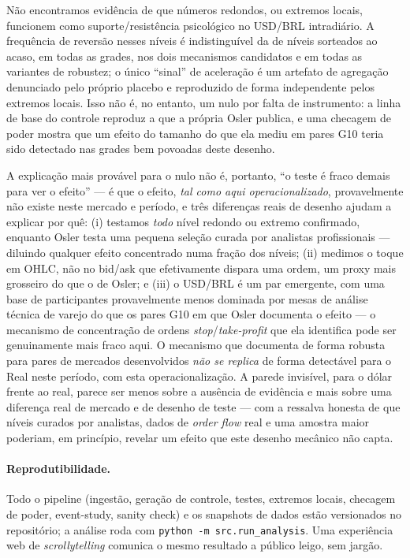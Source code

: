 \documentclass[11pt,a4paper]{article}
\begin{document}
Não encontramos evidência de que números redondos, ou extremos locais, funcionem como
suporte/resistência psicológico no USD/BRL intradiário. A frequência de reversão nesses
níveis é indistinguível da de níveis sorteados ao acaso, em todas as grades, nos dois
mecanismos candidatos e em todas as variantes de robustez; o único ``sinal'' de aceleração é
um artefato de agregação denunciado pelo próprio placebo e reproduzido de forma independente
pelos extremos locais. Isso não é, no entanto, um nulo por falta de instrumento: a linha de
base do controle reproduz a que a própria Osler publica, e uma checagem de poder mostra que um
efeito do tamanho do que ela mediu em pares G10 teria sido detectado nas grades bem povoadas
deste desenho.

A explicação mais provável para o nulo não é, portanto, ``o teste é fraco demais para ver o
efeito'' --- é que o efeito, \emph{tal como aqui operacionalizado}, provavelmente não existe
neste mercado e período, e três diferenças reais de desenho ajudam a explicar por quê: (i)
testamos \emph{todo} nível redondo ou extremo confirmado, enquanto Osler testa uma pequena
seleção curada por analistas profissionais --- diluindo qualquer efeito concentrado numa
fração dos níveis; (ii) medimos o toque em OHLC, não no bid/ask que efetivamente dispara uma
ordem, um proxy mais grosseiro do que o de Osler; e (iii) o USD/BRL é um par emergente, com
uma base de participantes provavelmente menos dominada por mesas de análise técnica de varejo
do que os pares G10 em que Osler documenta o efeito --- o mecanismo de concentração de ordens
\emph{stop}/\emph{take-profit} que ela identifica \citep{osler2003} pode ser genuinamente mais
fraco aqui. O mecanismo que \citet{osler2000} documenta de forma robusta para pares de
mercados desenvolvidos \emph{não se replica} de forma detectável para o Real neste período,
com esta operacionalização. A parede invisível, para o dólar frente ao real, parece ser menos
sobre a ausência de evidência e mais sobre uma diferença real de mercado e de desenho de
teste --- com a ressalva honesta de que níveis curados por analistas, dados de \emph{order
flow} real e uma amostra maior poderiam, em princípio, revelar um efeito que este desenho
mecânico não capta.

\paragraph{Reprodutibilidade.} Todo o pipeline (ingestão, geração de controle, testes,
extremos locais, checagem de poder, event-study, sanity check) e os snapshots de dados estão
versionados no repositório; a análise roda com \texttt{python -m src.run\_analysis}. Uma
experiência web de \emph{scrollytelling} comunica o mesmo resultado a público leigo, sem
jargão.



\end{document}
